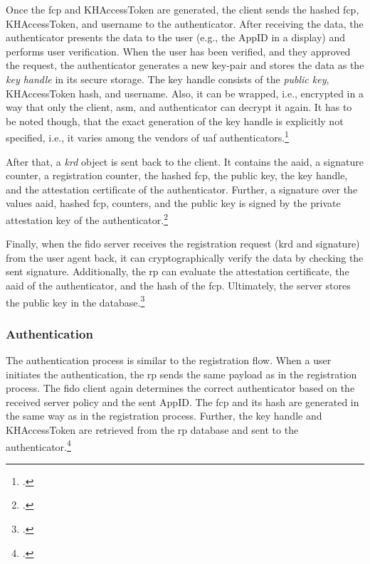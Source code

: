 Once the \gls{fcp} and KHAccessToken are generated, the client sends the hashed \gls{fcp}, KHAccessToken, and username to the authenticator. After receiving the data, the authenticator presents the data to the user (e.g., the AppID in a display) and performs user verification. When the user has been verified, and they approved the request, the authenticator generates a new key-pair and stores the data as the \textit{key handle} in its secure storage. The key handle consists of the \textit{public key}, KHAccessToken hash, and username. Also, it can be wrapped, i.e., encrypted in a way that only the client, \gls{asm}, and authenticator can decrypt it again. It has to be noted though, that the exact generation of the key handle is explicitly not specified, i.e., it varies among the vendors of \gls{uaf} authenticators.\footcites[See][9, 16--17]{uaf-asm}

 After that, a \textit{\gls{krd}} object is sent back to the client. It contains the \gls{aaid}, a signature counter, a registration counter, the hashed \gls{fcp}, the public key, the key handle, and the attestation certificate of the authenticator. Further, a signature over the values \gls{aaid}, hashed \gls{fcp}, counters, and the public key is signed by the private attestation key of the authenticator.\footcites[See][12--13]{analysis_fido_master_thesis}[See][22]{uaf-protocol}[See][17]{uaf-auth-commands}

Finally, when the \gls{fido} server receives the registration request (\gls{krd} and signature) from the user agent back, it can cryptographically verify the data by checking the sent signature. Additionally, the \gls{rp} can evaluate the attestation certificate, the \gls{aaid} of the authenticator, and the hash of the \gls{fcp}. Ultimately, the server stores the public key in the database.\footcites[See][192--193]{7897543}[See][23]{uaf-protocol}

\subsubsection{Authentication}

The authentication process is similar to the registration flow. When a user initiates the authentication, the \gls{rp} sends the same payload as in the registration process. The \gls{fido} client again determines the correct authenticator based on the received server policy and the sent AppID. The \gls{fcp} and its hash are generated in the same way as in the registration process. Further, the key handle and KHAccessToken are retrieved from the \gls{rp} database and sent to the authenticator.\footcites[See][132--133]{10.1007/978-3-319-67639-5_11}

